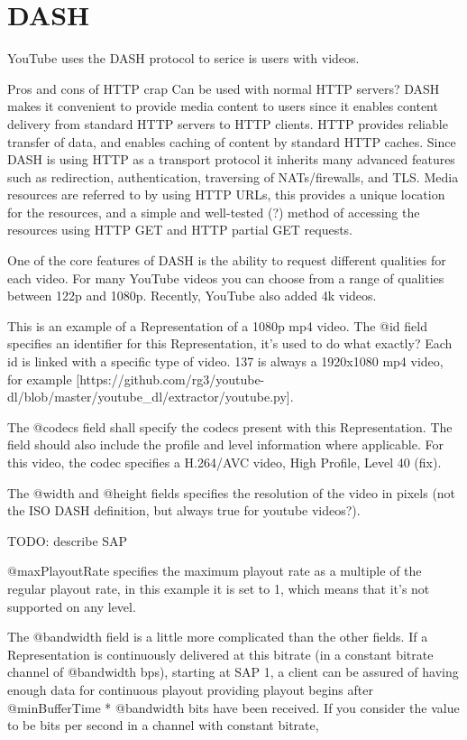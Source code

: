 \section{DASH}\label{dash}

YouTube uses the DASH protocol to serice is users with videos.

Pros and cons of HTTP crap Can be used with normal HTTP servers? DASH
makes it convenient to provide media content to users since it enables
content delivery from standard HTTP servers to HTTP clients. HTTP
provides reliable transfer of data, and enables caching of content by
standard HTTP caches. Since DASH is using HTTP as a transport protocol
it inherits many advanced features such as redirection, authentication,
traversing of NATs/firewalls, and TLS. Media resources are referred to
by using HTTP URLs, this provides a unique location for the resources,
and a simple and well-tested (?) method of accessing the resources using
HTTP GET and HTTP partial GET requests.

One of the core features of DASH is the ability to request different
qualities for each video. For many YouTube videos you can choose from a
range of qualities between 122p and 1080p. Recently, YouTube also added
4k videos.

This is an example of a Representation of a 1080p mp4 video. The @id
field specifies an identifier for this Representation, it's used to do
what exactly? Each id is linked with a specific type of video. 137 is
always a 1920x1080 mp4 video, for example
{[}https://github.com/rg3/youtube-dl/blob/master/youtube\_dl/extractor/youtube.py{]}.

The @codecs field shall specify the codecs present with this
Representation. The field should also include the profile and level
information where applicable. For this video, the codec specifies a
H.264/AVC video, High Profile, Level 40 (fix).

The @width and @height fields specifies the resolution of the video in
pixels (not the ISO DASH definition, but always true for youtube
videos?).

TODO: describe SAP

@maxPlayoutRate specifies the maximum playout rate as a multiple of the
regular playout rate, in this example it is set to 1, which means that
it's not supported on any level.

The @bandwidth field is a little more complicated than the other fields.
If a Representation is continuously delivered at this bitrate (in a
constant bitrate channel of @bandwidth bps), starting at SAP 1, a client
can be assured of having enough data for continuous playout providing
playout begins after @minBufferTime * @bandwidth bits have been
received. If you consider the value to be bits per second in a channel
with constant bitrate,

